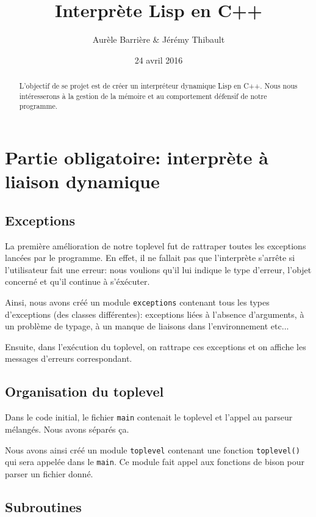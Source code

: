 \documentclass[12pt]{article}
\title{Interprète Lisp en C++}
\author{Aurèle Barrière \& Jérémy Thibault}
\date{24 avril 2016}
\def\code #1{\lstinline{#1}}
\begin{document}
\maketitle
\tableofcontents

\begin{abstract}
  L'objectif de se projet est de créer un interpréteur dynamique Lisp en C++. Nous nous intéresserons à la gestion de la mémoire et au comportement défensif de notre programme.
\end{abstract}
\newpage

\section{Partie obligatoire: interprète à liaison dynamique}

\subsection{Exceptions}
La première amélioration de notre toplevel fut de rattraper toutes les exceptions lancées par le programme. En effet, il ne fallait pas que l'interprète s'arrête si l'utilisateur fait une erreur: nous voulions qu'il lui indique le type d'erreur, l'objet concerné et qu'il continue à s'éxécuter.

Ainsi, nous avons créé un module \code{exceptions} contenant tous les types d'exceptions (des classes différentes): exceptions liées à l'absence d'arguments, à un problème de typage, à un manque de liaisons dans l'environnement etc...

Ensuite, dans l'exécution du toplevel, on rattrape ces exceptions et on affiche les messages d'erreurs correspondant.

\subsection{Organisation du toplevel}

Dans le code initial, le fichier \code{main} contenait le toplevel et l'appel au parseur mélangés. Nous avons séparés ça.

Nous avons ainsi créé un module \code{toplevel} contenant une fonction \code{toplevel()} qui sera appelée dans le \code{main}. Ce module fait appel aux fonctions de bison pour parser un fichier donné.

\subsection{Subroutines}
\end{document}
